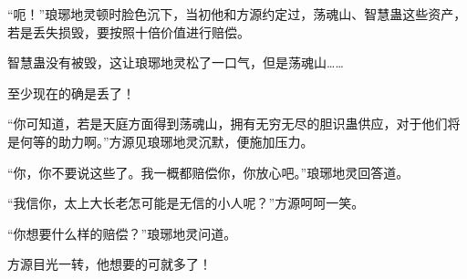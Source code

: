\begin{this_body}
“呃！”琅琊地灵顿时脸色沉下，当初他和方源约定过，荡魂山、智慧蛊这些资产，若是丢失损毁，要按照十倍价值进行赔偿。

智慧蛊没有被毁，这让琅琊地灵松了一口气，但是荡魂山……

至少现在的确是丢了！

“你可知道，若是天庭方面得到荡魂山，拥有无穷无尽的胆识蛊供应，对于他们将是何等的助力啊。”方源见琅琊地灵沉默，便施加压力。

“你，你不要说这些了。我一概都赔偿你，你放心吧。”琅琊地灵回答道。

“我信你，太上大长老怎可能是无信的小人呢？”方源呵呵一笑。

“你想要什么样的赔偿？”琅琊地灵问道。

方源目光一转，他想要的可就多了！

\end{this_body}

